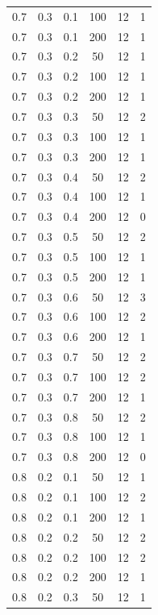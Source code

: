 \documentclass[a4paper,14pt, unknownkeysallowed]{extreport}
\begin{document}
\begin{center}
\begin{longtable}[c]{|c|c|c|c|c|c|}
	0.7 &  0.3 &  0.1 &  100 &    12 &     1 \\
	0.7 &  0.3 &  0.1 &  200 &    12 &     1 \\
   \hline
	0.7 &  0.3 &  0.2 &   50 &    12 &     1 \\
	0.7 &  0.3 &  0.2 &  100 &    12 &     1 \\
	0.7 &  0.3 &  0.2 &  200 &    12 &     1 \\
   \hline
	0.7 &  0.3 &  0.3 &   50 &    12 &     2 \\
	0.7 &  0.3 &  0.3 &  100 &    12 &     1 \\
	0.7 &  0.3 &  0.3 &  200 &    12 &     1 \\
   \hline
	0.7 &  0.3 &  0.4 &   50 &    12 &     2 \\
	0.7 &  0.3 &  0.4 &  100 &    12 &     1 \\
	0.7 &  0.3 &  0.4 &  200 &    12 &     0 \\
   \hline
	0.7 &  0.3 &  0.5 &   50 &    12 &     2 \\
	0.7 &  0.3 &  0.5 &  100 &    12 &     1 \\
	0.7 &  0.3 &  0.5 &  200 &    12 &     1 \\
   \hline
	0.7 &  0.3 &  0.6 &   50 &    12 &     3 \\
	0.7 &  0.3 &  0.6 &  100 &    12 &     2 \\
	0.7 &  0.3 &  0.6 &  200 &    12 &     1 \\
   \hline
	0.7 &  0.3 &  0.7 &   50 &    12 &     2 \\
	0.7 &  0.3 &  0.7 &  100 &    12 &     2 \\
	0.7 &  0.3 &  0.7 &  200 &    12 &     1 \\
   \hline
	0.7 &  0.3 &  0.8 &   50 &    12 &     2 \\
	0.7 &  0.3 &  0.8 &  100 &    12 &     1 \\
	0.7 &  0.3 &  0.8 &  200 &    12 &     0 \\
   \hline
	0.8 &  0.2 &  0.1 &   50 &    12 &     1 \\
	0.8 &  0.2 &  0.1 &  100 &    12 &     2 \\
	0.8 &  0.2 &  0.1 &  200 &    12 &     1 \\
   \hline
	0.8 &  0.2 &  0.2 &   50 &    12 &     2 \\
	0.8 &  0.2 &  0.2 &  100 &    12 &     2 \\
	0.8 &  0.2 &  0.2 &  200 &    12 &     1 \\
   \hline
	0.8 &  0.2 &  0.3 &   50 &    12 &     1 \\

\end{longtable}
\end{center}
\end{document}
